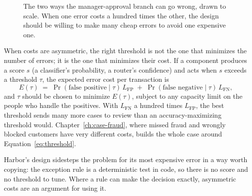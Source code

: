 \begin{figure}[htbp]
\centering
{}
\caption{The two ways the manager-approval branch can go wrong, drawn to scale. When one error costs a hundred times the other, the design should be willing to make many cheap errors to avoid one expensive one.}
\label{fig:asym}
\end{figure}

When costs are asymmetric, the right threshold is not the one that minimizes the number of errors; it is the one that minimizes their cost. If a component produces a score $s$ (a classifier's probability, a router's confidence) and acts when $s$ exceeds a threshold $\tau$, the expected error cost per transaction is
\begin{equation}
  E(\tau) \;=\; \Pr(\text{false positive} \mid \tau)\, L_{\text{FP}} \;+\; \Pr(\text{false negative} \mid \tau)\, L_{\text{FN}},
  \label{eq:threshold}
\end{equation}
and $\tau$ should be chosen to minimize $E(\tau)$, subject to any capacity limit on the people who handle the positives. With $L_{\text{FN}}$ a hundred times $L_{\text{FP}}$, the best threshold sends many more cases to review than an accuracy-maximizing threshold would. Chapter~\ref{ch:case-fraud}, where missed fraud and wrongly blocked customers have very different costs, builds the whole case around Equation~\eqref{eq:threshold}.

Harbor's design sidesteps the problem for its most expensive error in a way worth copying: the exception rule is a deterministic test in code, so there is no score and no threshold to tune. Where a rule can make the decision exactly, asymmetric costs are an argument for using it.


